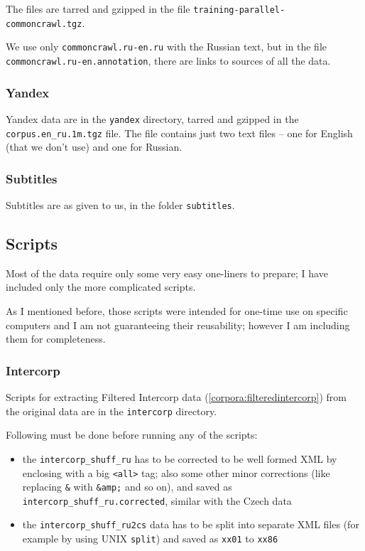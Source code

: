 The files are tarred and gzipped in the file \texttt{training-\allowbreak parallel-\allowbreak commoncrawl.tgz}. 

We use only \texttt{commoncrawl.\allowbreak ru-\allowbreak en.\allowbreak ru}
with the Russian text, but in the file \texttt{commoncrawl.\allowbreak ru-\allowbreak en.\allowbreak annotation}, there are links to sources of all the data.
\subsubsection{Yandex}
Yandex data are in the \texttt{yandex} directory, tarred and gzipped in the \texttt{corpus.\allowbreak en\_ru.\allowbreak 1m.\allowbreak tgz} file. The file contains just two text files -- one for English (that we don't use) and one for Russian.
\subsubsection{Subtitles}
Subtitles are as given to us, in the folder \texttt{subtitles}.


\subsection{Scripts}
Most of the data require only some very easy one-liners to prepare; I have included only the more complicated scripts. 

As I mentioned before, those scripts were intended for one-time use on specific computers and I am not guaranteeing their reusability; however I am including them for completeness.

\subsubsection{Intercorp}
Scripts for extracting Filtered Intercorp data (\ref{corpora:filteredintercorp}) from the original data are in the \texttt{intercorp} directory.

Following must be done before running any of the scripts:
\begin{itemize}
\item the \texttt{intercorp\_shuff\_ru} has to be corrected to be well formed XML by enclosing with a big \texttt{<all>} tag; also some other minor corrections (like replacing \texttt{\&} with \texttt{\&amp;} and so on), and saved as \texttt{intercorp\_shuff\_ru.corrected}, similar with the Czech data
\item the \texttt{intercorp\_shuff\_ru2cs} data has to be split into separate XML files (for example by using UNIX \texttt{split}) and saved as \texttt{xx01} to \texttt{xx86}
\end{itemize}

